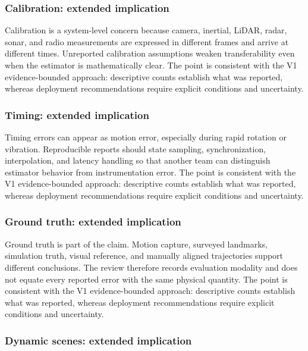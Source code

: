 \documentclass[
  journal,
  10pt]{IEEEtran}
\begin{document}
\subsubsection{Calibration: extended
implication}\label{calibration-extended-implication}

Calibration is a system-level concern because camera, inertial, LiDAR,
radar, sonar, and radio measurements are expressed in different frames
and arrive at different times. Unreported calibration assumptions weaken
transferability even when the estimator is mathematically clear. The
point is consistent with the V1 evidence-bounded approach: descriptive
counts establish what was reported, whereas deployment recommendations
require explicit conditions and uncertainty.

\subsubsection{Timing: extended
implication}\label{timing-extended-implication}

Timing errors can appear as motion error, especially during rapid
rotation or vibration. Reproducible reports should state sampling,
synchronization, interpolation, and latency handling so that another
team can distinguish estimator behavior from instrumentation error. The
point is consistent with the V1 evidence-bounded approach: descriptive
counts establish what was reported, whereas deployment recommendations
require explicit conditions and uncertainty.

\subsubsection{Ground truth: extended
implication}\label{ground-truth-extended-implication}

Ground truth is part of the claim. Motion capture, surveyed landmarks,
simulation truth, visual reference, and manually aligned trajectories
support different conclusions. The review therefore records evaluation
modality and does not equate every reported error with the same physical
quantity. The point is consistent with the V1 evidence-bounded approach:
descriptive counts establish what was reported, whereas deployment
recommendations require explicit conditions and uncertainty.

\subsubsection{Dynamic scenes: extended
implication}\label{dynamic-scenes-extended-implication}
\end{document}
